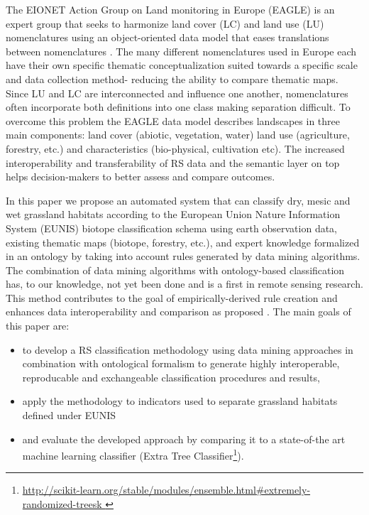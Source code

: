 \documentclass[authoryear, review,12pt,number]{elsarticle}
\begin{document}
The EIONET Action Group on Land monitoring in Europe (EAGLE) is an expert group
that seeks to harmonize land cover (LC) and land use (LU) nomenclatures using an
object-oriented data model that eases translations between nomenclatures
\citep{arnold2013eagle}. The many different nomenclatures used in Europe each
have their own specific thematic conceptualization suited towards a specific
scale and data collection method- reducing the ability to compare thematic maps.
Since LU and LC are interconnected and influence one another, nomenclatures
often incorporate both definitions into one class making separation difficult.
To overcome this problem the EAGLE data model describes landscapes in three main
components: land cover (abiotic, vegetation, water) land use (agriculture,
forestry, etc.) and characteristics (bio-physical, cultivation etc). The
increased interoperability and transferability of RS data and the semantic layer
on top helps decision-makers to better assess and compare outcomes. 

In this paper we propose an automated system that can classify dry, mesic and
wet grassland habitats according to the European Union Nature Information System
(EUNIS) biotope classification schema using earth observation data, existing
thematic maps (biotope, forestry, etc.), and expert knowledge formalized in an
ontology by taking into account rules generated by data mining algorithms. The
combination of data mining algorithms with ontology-based classification has, to
our knowledge, not yet been done and is a first in remote sensing research.
This method contributes to the goal of empirically-derived rule creation and
enhances data interoperability and comparison as proposed \cite{Janowicz2012}.
The main goals of this paper are:
\begin{itemize}
 \item to develop a RS classification methodology using data mining approaches
     in combination with ontological formalism to generate highly interoperable,
     reproducable and exchangeable classification procedures and results,
 \item apply the methodology to indicators used to separate grassland habitats
     defined under EUNIS
 \item and evaluate the developed approach by comparing it to a state-of-the art
     machine learning classifier (Extra Tree 
Classifier\footnote{\url{
http://scikit-learn.org/stable/modules/ensemble.html#extremely-randomized-treesk
}}).
\end{itemize}
\end{document}
